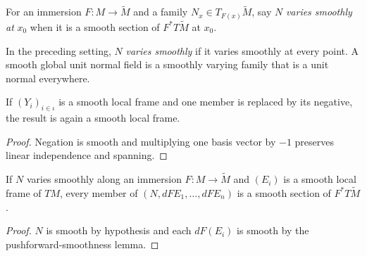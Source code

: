 \begin{definition}
\label{def:smooth-normal-at}





For an immersion $F:M\to\widetilde M$ and a family $N_x\in T_{F(x)}\widetilde M$, say $N$ \emph{varies smoothly at} $x_0$ when it is a smooth section of $F^*T\widetilde M$ at $x_0$.
\end{definition}

\begin{definition}
\label{def:smooth-unit-normal-field}





In the preceding setting, $N$ \emph{varies smoothly} if it varies smoothly at every point. A smooth global unit normal field is a smoothly varying family that is a unit normal everywhere.
\end{definition}

\begin{lemma}
\label{lem:frame-neg-member}




If $(Y_i)_{i\in\iota}$ is a smooth local frame and one member is replaced by its negative, the result is again a smooth local frame.
\end{lemma}

\begin{proof}

\sketch Negation is smooth and multiplying one basis vector by $-1$ preserves linear independence and spanning.
\end{proof}

\begin{lemma}
\label{lem:adapted-frame-smooth}





If $N$ varies smoothly along an immersion $F:M\to\widetilde M$ and $(E_i)$ is a smooth local frame of $TM$, every member of $(N,dFE_1,\ldots,dFE_n)$ is a smooth section of $F^*T\widetilde M$.
\end{lemma}

\begin{proof}

\sketch $N$ is smooth by hypothesis and each $dF(E_i)$ is smooth by the pushforward-smoothness lemma.
\end{proof}

